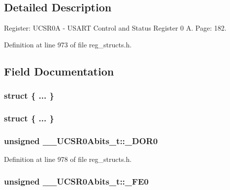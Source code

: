 \subsection{Detailed Description}
Register\+: U\+C\+S\+R0\+A -\/ U\+S\+A\+R\+T Control and Status Register 0 A. Page\+: 182. 

Definition at line 973 of file reg\+\_\+structs.\+h.



\subsection{Field Documentation}
\hypertarget{union_____u_c_s_r0_abits__t_aa3852912166732b6b7cd017981a78eaf}{\subsubsection[{"@237}]{\setlength{\rightskip}{0pt plus 5cm}struct \{ ... \} }}\label{union_____u_c_s_r0_abits__t_aa3852912166732b6b7cd017981a78eaf}
\hypertarget{union_____u_c_s_r0_abits__t_a0a078b8d21fae72be4ac043984119595}{\subsubsection[{"@239}]{\setlength{\rightskip}{0pt plus 5cm}struct \{ ... \} }}\label{union_____u_c_s_r0_abits__t_a0a078b8d21fae72be4ac043984119595}
\hypertarget{union_____u_c_s_r0_abits__t_a5d58b9f6c1df9ac79c5b7a9f025d5e37}{
\subsubsection[{\+\_\+\+D\+O\+R0}]{\setlength{\rightskip}{0pt plus 5cm}unsigned \+\_\+\+\_\+\+U\+C\+S\+R0\+Abits\+\_\+t\+::\+\_\+\+D\+O\+R0}}\label{union_____u_c_s_r0_abits__t_a5d58b9f6c1df9ac79c5b7a9f025d5e37}


Definition at line 978 of file reg\+\_\+structs.\+h.

\hypertarget{union_____u_c_s_r0_abits__t_af150a0a9ac1abaa2a8df78edfe0cba75}{
\subsubsection[{\+\_\+\+F\+E0}]{\setlength{\rightskip}{0pt plus 5cm}unsigned \+\_\+\+\_\+\+U\+C\+S\+R0\+Abits\+\_\+t\+::\+\_\+\+F\+E0}}\label{union_____u_c_s_r0_abits__t_af150a0a9ac1abaa2a8df78edfe0cba75}


